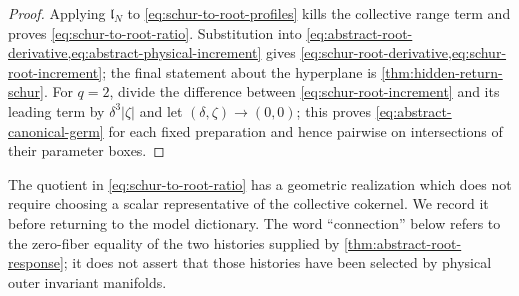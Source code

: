 \begin{proof}
Applying \(\mathfrak l_N\) to
\cref{eq:schur-to-root-profiles} kills the collective range term and proves
\cref{eq:schur-to-root-ratio}.  Substitution into
\cref{eq:abstract-root-derivative,eq:abstract-physical-increment} gives
\cref{eq:schur-root-derivative,eq:schur-root-increment}; the final statement
about the hyperplane is \cref{thm:hidden-return-schur}.  For \(q=2\), divide
the difference between \cref{eq:schur-root-increment} and its leading term by
\(\delta^3|\zeta|\) and let \((\delta,\zeta)\to(0,0)\); this proves
\cref{eq:abstract-canonical-germ} for each fixed preparation and hence
pairwise on intersections of their parameter boxes.
\end{proof}

The quotient in \cref{eq:schur-to-root-ratio} has a geometric realization
which does not require choosing a scalar representative of the collective
cokernel.  We record it before returning to the model dictionary.  The word
``connection'' below refers to the zero-fiber equality of the two histories
supplied by \cref{thm:abstract-root-response}; it does not assert that those
histories have been selected by physical outer invariant manifolds.

